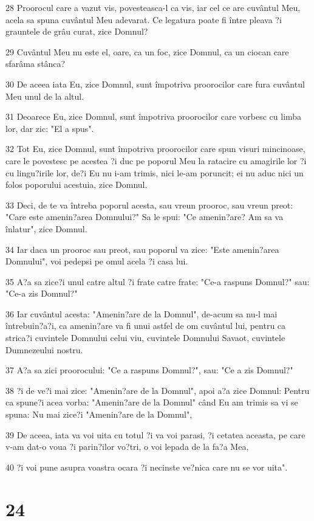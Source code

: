 \par 28 Proorocul care a vazut vis, povesteasca-l ca vis, iar cel ce are cuvântul Meu, acela sa spuna cuvântul Meu adevarat. Ce legatura poate fi între pleava ?i grauntele de grâu curat, zice Domnul?
\par 29 Cuvântul Meu nu este el, oare, ca un foc, zice Domnul, ca un ciocan care sfarâma stânca?
\par 30 De aceea iata Eu, zice Domnul, sunt împotriva proorocilor care fura cuvântul Meu unul de la altul.
\par 31 Deoarece Eu, zice Domnul, sunt împotriva proorocilor care vorbesc cu limba lor, dar zic: "El a spus".
\par 32 Tot Eu, zice Domnul, sunt împotriva proorocilor care spun visuri mincinoase, care le povestesc pe acestea ?i duc pe poporul Meu la ratacire cu amagirile lor ?i cu lingu?irile lor, de?i Eu nu i-am trimis, nici le-am poruncit; ei nu aduc nici un folos poporului acestuia, zice Domnul.
\par 33 Deci, de te va întreba poporul acesta, sau vreun prooroc, sau vreun preot: "Care este amenin?area Domnului?" Sa le spui: "Ce amenin?are? Am sa va înlatur", zice Domnul.
\par 34 Iar daca un prooroc sau preot, sau poporul va zice: "Este amenin?area Domnului", voi pedepsi pe omul acela ?i casa lui.
\par 35 A?a sa zice?i unul catre altul ?i frate catre frate: "Ce-a raspuns Domnul?" sau: "Ce-a zis Domnul?"
\par 36 Iar cuvântul acesta: "Amenin?are de la Domnul", de-acum sa nu-l mai întrebuin?a?i, ca amenin?are va fi unui astfel de om cuvântul lui, pentru ca strica?i cuvintele Domnului celui viu, cuvintele Domnului Savaot, cuvintele Dumnezeului nostru.
\par 37 A?a sa zici proorocului: "Ce a raspuns Domnul?", sau: "Ce a zis Domnul?"
\par 38 ?i de ve?i mai zice: "Amenin?are de la Domnul", apoi a?a zice Domnul: Pentru ca spune?i acea vorba: "Amenin?are de la Domnul" când Eu am trimis sa vi se spuna: Nu mai zice?i "Amenin?are de la Domnul",
\par 39 De aceea, iata va voi uita cu totul ?i va voi parasi, ?i cetatea aceasta, pe care v-am dat-o voua ?i parin?ilor vo?tri, o voi lepada de la fa?a Mea,
\par 40 ?i voi pune asupra voastra ocara ?i necinste ve?nica care nu se vor uita".

\chapter{24}

